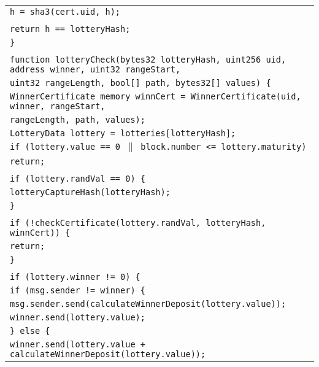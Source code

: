 \documentclass[a4paper]{article}
\begin{document}
\begin{tabularx}{\linewidth}{l}
        \qquad\qquad\texttt{h = sha3(cert.uid, h);}\\
        \\
        \qquad\qquad\texttt{return h == lotteryHash;}\\
        \qquad\texttt{\}}\\
        \\
        \qquad\texttt{function lotteryCheck(bytes32 lotteryHash, uint256 uid, address winner, uint32 rangeStart,}\\
        \qquad\qquad\qquad\qquad\texttt{uint32 rangeLength, bool[] path, bytes32[] values) \{}\\
        \qquad\qquad\texttt{WinnerCertificate memory winnCert = WinnerCertificate(uid, winner, rangeStart,}\\
        \qquad\qquad\qquad\qquad\qquad\qquad\qquad\texttt{rangeLength, path, values);}\\
        \qquad\qquad\texttt{LotteryData lottery = lotteries[lotteryHash];}\\
        \qquad\qquad\texttt{if (lottery.value == 0 $\|$ block.number <= lottery.maturity)}\\
        \qquad\qquad\qquad\texttt{return;}\\
        \\
        \qquad\qquad\texttt{if (lottery.randVal == 0) \{}\\
        \qquad\qquad\qquad\texttt{lotteryCaptureHash(lotteryHash);}\\
        \qquad\qquad\texttt{\}}\\
        \\
        \qquad\qquad\texttt{if (!checkCertificate(lottery.randVal, lotteryHash, winnCert)) \{}\\
        \qquad\qquad\qquad\texttt{return;}\\
        \qquad\qquad\texttt{\}}\\
        \\
        \qquad\qquad\texttt{if (lottery.winner != 0) \{}\\
        \qquad\qquad\qquad\texttt{if (msg.sender != winner) \{}\\
        \qquad\qquad\qquad\qquad\texttt{msg.sender.send(calculateWinnerDeposit(lottery.value));}\\
        \qquad\qquad\qquad\qquad\texttt{winner.send(lottery.value);}\\
        \qquad\qquad\qquad\texttt{\} else \{}\\
        \qquad\qquad\qquad\qquad\texttt{winner.send(lottery.value + calculateWinnerDeposit(lottery.value));}\\

\end{tabularx}
\end{document}
